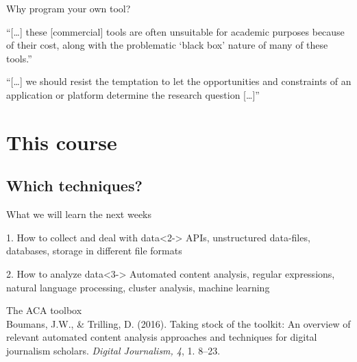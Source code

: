 \documentclass[handout]{beamer}
\begin{document}
\begin{frame}{Why program your own tool?}
\begin{block}{\textcite{Vis2013}}
``{[}\ldots{]} these {[}commercial{]} tools are often unsuitable for academic purposes because of their cost, along with the problematic `black box' nature of many of these tools.''
\end{block}

\begin{block}{\textcite{Mahrt2013}}
``{[}\ldots{]} we should resist the temptation to let the opportunities and constraints of an application or platform determine the research question {[}\ldots{]}''
\end{block}
	
\end{frame}


\section{This course}


\subsection{Which techniques?}

\begin{frame}{What we will learn the next weeks}
	\begin{block}{1. How to collect and deal with data}<2->
		APIs, unstructured data-files, databases, storage in different file formats
	\end{block}
	\begin{block}{2. How to analyze data}<3->
		Automated content analysis, regular expressions, natural language processing, cluster analysis, machine learning
	\end{block}
\end{frame}


\begin{frame}{The ACA toolbox}
	\\
	\tiny
	Boumans, J.W., \& Trilling, D. (2016). Taking stock of the toolkit: An overview of relevant automated content analysis approaches and techniques for digital journalism scholars. \emph{Digital Journalism, 4}, 1. 8--23.
\end{frame}
\end{document}
